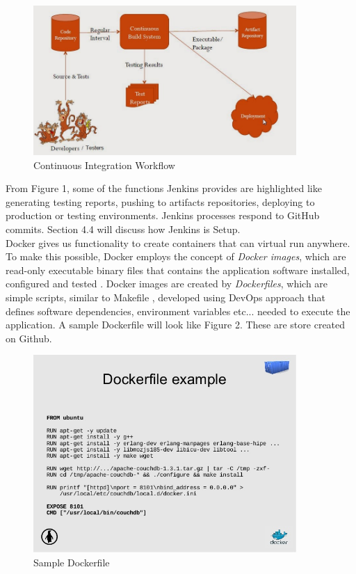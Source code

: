 \documentclass [titlepage,11pt]{article}
\begin{document}
\begin{figure}[!hb]
\centering
\includegraphics[width=10cm]{Workflow.jpg}
\caption{Continuous Integration Workflow}
\end{figure}

From Figure 1, some of the functions Jenkins provides are highlighted like generating testing reports, pushing to artifacts repositories, deploying to production or testing environments. Jenkins processes respond to GitHub commits. Section 4.4 will discuss how Jenkins is Setup. \\

Docker gives us functionality to create containers that can virtual run anywhere. To make this possible, Docker employs the concept of \emph{Docker images}, which are read-only executable binary files that contains the application software installed, configured and tested \cite{carl15}. Docker images are created by \emph{Dockerfiles}, which are simple scripts, similar to Makefile \citep{makefile}, developed using DevOps approach that defines software dependencies, environment variables etc... needed to execute the application. A sample Dockerfile will look like Figure 2. These are store created on Github.
\begin{figure}[!hb]
\centering
\includegraphics[width=10cm]{Dockerfile.jpg}
\caption{Sample Dockerfile}
\end{figure}
\end{document}
